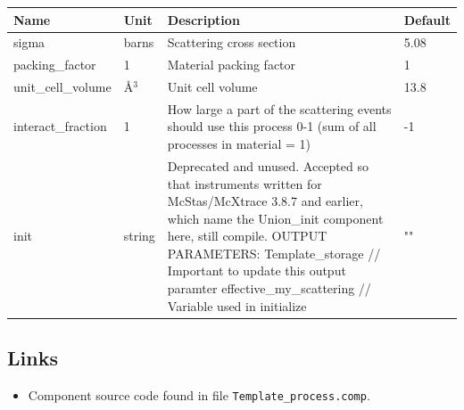 \begin{longtable}{p{}p{}p{}p{}}
\toprule
\textbf{Name} & \textbf{Unit} & \textbf{Description} & \textbf{Default} \\
\midrule
\endhead
sigma & barns & Scattering cross section & 5.08 \\
packing\_factor & 1 & Material packing factor & 1 \\
unit\_cell\_volume & \AA{}$^{3}$ & Unit cell volume & 13.8 \\
interact\_fraction & 1 & How large a part of the scattering events should use this process 0-1 (sum of all processes in material = 1) & -1 \\
init & string & Deprecated and unused. Accepted so that instruments written for McStas/McXtrace 3.8.7 and earlier, which name the Union\_init component here, still compile. OUTPUT PARAMETERS: Template\_storage          // Important to update this output paramter effective\_my\_scattering   // Variable used in initialize & "" \\
\bottomrule
\end{longtable}

\subsection*{Links}
\begin{itemize}
  \item Component source code found in file \texttt{Template\_process.comp}.
\end{itemize}
